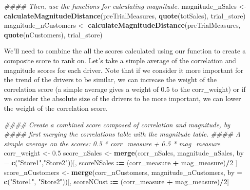 \documentclass[
]{article}
\newenvironment{Shaded}{\begin{snugshade}}{\end{snugshade}}
\newcommand{\CommentTok}[1]{\textcolor[rgb]{0.56,0.35,0.01}{\textit{#1}}}
\newcommand{\DataTypeTok}[1]{\textcolor[rgb]{0.13,0.29,0.53}{#1}}
\newcommand{\DecValTok}[1]{\textcolor[rgb]{0.00,0.00,0.81}{#1}}
\newcommand{\ErrorTok}[1]{\textcolor[rgb]{0.64,0.00,0.00}{\textbf{#1}}}
\newcommand{\FloatTok}[1]{\textcolor[rgb]{0.00,0.00,0.81}{#1}}
\newcommand{\KeywordTok}[1]{\textcolor[rgb]{0.13,0.29,0.53}{\textbf{#1}}}
\newcommand{\NormalTok}[1]{#1}
\newcommand{\OperatorTok}[1]{\textcolor[rgb]{0.81,0.36,0.00}{\textbf{#1}}}
\newcommand{\StringTok}[1]{\textcolor[rgb]{0.31,0.60,0.02}{#1}}
\begin{document}
\begin{Shaded}
\begin{Highlighting}[]
\CommentTok{#### Then, use the functions for calculating magnitude.}
\NormalTok{magnitude_nSales <-}\StringTok{ }\KeywordTok{calculateMagnitudeDistance}\NormalTok{(preTrialMeasures, }\KeywordTok{quote}\NormalTok{(totSales),}
\NormalTok{trial_store)}
\NormalTok{magnitude_nCustomers <-}\StringTok{ }\KeywordTok{calculateMagnitudeDistance}\NormalTok{(preTrialMeasures,}
\KeywordTok{quote}\NormalTok{(nCustomers), trial_store)}
\end{Highlighting}
\end{Shaded}

We'll need to combine the all the scores calculated using our function
to create a composite score to rank on. Let's take a simple average of
the correlation and magnitude scores for each driver. Note that if we
consider it more important for the trend of the drivers to be similar,
we can increase the weight of the correlation score (a simple average
gives a weight of 0.5 to the corr\_weight) or if we consider the
absolute size of the drivers to be more important, we can lower the
weight of the correlation score.

\begin{Shaded}
\begin{Highlighting}[]
\CommentTok{#### Create a combined score composed of correlation and magnitude, by}
\CommentTok{#### first merging the correlations table with the magnitude table.}
\CommentTok{#### A simple average on the scores: 0.5 * corr_measure + 0.5 * mag_measure}
\NormalTok{corr_weight <-}\StringTok{ }\FloatTok{0.5}
\NormalTok{score_nSales <-}\StringTok{ }\KeywordTok{merge}\NormalTok{(corr_nSales, magnitude_nSales, }\DataTypeTok{by =} 
          \KeywordTok{c}\NormalTok{(}\StringTok{"Store1"}\NormalTok{,}\StringTok{"Store2"}\NormalTok{))[, scoreNSales }\OperatorTok{:}\ErrorTok{=}\StringTok{ }\NormalTok{(corr_measure }\OperatorTok{+}\StringTok{ }\NormalTok{mag_measure)}\OperatorTok{/}\DecValTok{2}\NormalTok{ ]}
\NormalTok{score_nCustomers <-}\StringTok{ }\KeywordTok{merge}\NormalTok{(corr_nCustomers, magnitude_nCustomers, }\DataTypeTok{by =}
        \KeywordTok{c}\NormalTok{(}\StringTok{"Store1"}\NormalTok{, }\StringTok{"Store2"}\NormalTok{))[, scoreNCust }\OperatorTok{:}\ErrorTok{=}\StringTok{ }\NormalTok{(corr_measure }\OperatorTok{+}\StringTok{ }\NormalTok{mag_measure)}\OperatorTok{/}\DecValTok{2}\NormalTok{]}
\end{Highlighting}
\end{Shaded}
\end{document}

